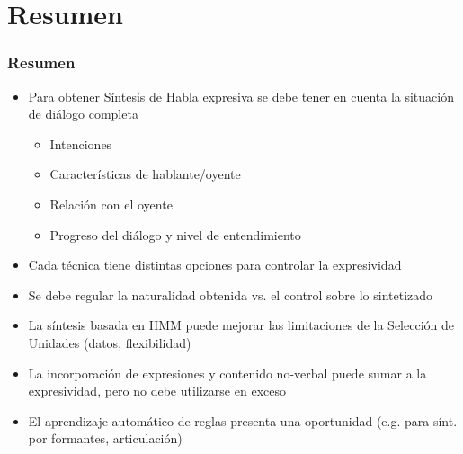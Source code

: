 \documentclass[10pt,presentation]{beamer}
\begin{document}
\section{Resumen}
\begin{frame}
  \frametitle{Resumen}
  \begin{itemize}
    \item \pause Para obtener Síntesis de Habla expresiva se debe tener en cuenta la situación de diálogo completa \pause
    \begin{itemize}
      \item Intenciones \pause
      \item Características de hablante/oyente \pause
      \item Relación con el oyente \pause
      \item Progreso del diálogo y nivel de entendimiento \pause
    \end{itemize}
    \item Cada técnica tiene distintas opciones para controlar la expresividad \pause
    \item Se debe regular la naturalidad obtenida vs. el control sobre lo sintetizado \pause
    \item La síntesis basada en HMM puede mejorar las limitaciones de la Selección de Unidades (datos, flexibilidad) \pause
    \item La incorporación de expresiones y contenido no-verbal puede sumar a la expresividad, pero no debe utilizarse en exceso \pause
    \item El aprendizaje automático de reglas presenta una oportunidad (e.g. para sínt. por formantes, articulación)
  \end{itemize}
\end{frame}
\end{document}
